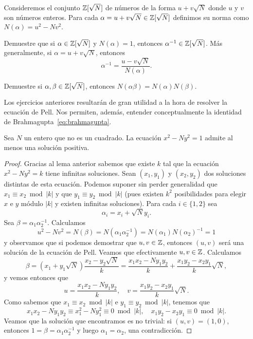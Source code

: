 Consideremos el conjunto $\mathbb{Z}[\sqrt{N}]$ de números de la forma $u+v\sqrt{N}$
donde $u$ y $v$ son números enteros.  Para cada
$\alpha=u+v\sqrt{N}\in\mathbb{Z}[\sqrt{N}]$ definimos su norma como
$N(\alpha)=u^2-Nv^2$. 

\begin{exercise}
	\label{xca:Pell}
	Demuestre que si $\alpha\in\mathbb{Z}[\sqrt{N}]$ y $N(\alpha)=1$, entonces
	$\alpha^{-1}\in\mathbb{Z}[\sqrt{N}]$. Más generalmente, si $\alpha=u+v\sqrt{N}$,
	entonces
	\[
		\alpha^{-1}=\frac{u-v\sqrt{N}}{N(\alpha)}.
	\]
\end{exercise}

\begin{exercise}
	Demuestre si $\alpha,\beta\in\mathbb{Z}[\sqrt{N}]$, entonces
	$N(\alpha\beta)=N(\alpha)N(\beta)$.
\end{exercise}

Los ejercicios anteriores resultarán de gran utilidad a la hora de resolver la
ecuación de Pell. Nos permiten, además, entender conceptualmente la identidad
de Brahmagupta~\eqref{eq:brahmagupta}. 

\begin{theorem}[Lagrange]
	Sea $N$ un entero que no es un cuadrado. La ecuación $x^2-Ny^2=1$ admite al
	menos una solución positiva. 
\end{theorem}

\begin{proof}
	Gracias al lema anterior sabemos que existe $k$ tal que la ecuación
	$x^2-Ny^2=k$ tiene infinitas soluciones. Sean $(x_1,y_1)$ y $(x_2,y_2)$ dos
	soluciones distintas de esta ecuación. Podemos suponer sin perder generalidad que
	$x_1\equiv x_2\bmod{|k|}$ y que $y_1\equiv y_2\bmod{|k|}$ (pues existen
	$k^2$ posibilidades para elegir $x$ e $y$ módulo $|k|$ y existen infinitas
	soluciones). Para cada $i\in\{1,2\}$ sea 
	\[
		\alpha_i=x_i+\sqrt{N}y_i.
	\]
	Sea $\beta=\alpha_1\alpha_2^{-1}$. Calculamos 
	\[
		u^2-Nv^2=N(\beta)=N(\alpha_1\alpha_2^{-1})=N(\alpha_1)N(\alpha_2)^{-1}=1 
	\]
	y observamos que si podemos demostrar que $u,v\in\mathbb{Z}$, entonces $(u,v)$ será
	una solución de la ecuación de Pell. Veamos que efectivamente $u,v\in\mathbb{Z}$.
	Calculamos 
	\[
		\beta=(x_1+y_1\sqrt{N})\frac{x_2-y_2\sqrt{N}}{k}
		=\frac{x_1x_2-Ny_1y_2}{k}+\frac{x_1y_2-x_2y_1}{k}\sqrt{N},
	\]
	y vemos entonces que
	\[
	u=\frac{x_1x_2-Ny_1y_2}{k},
	\quad
	v=\frac{x_1y_2-x_2y_1}{k}\sqrt{N}.
	\]
	Como 
	sabemos que $x_1\equiv x_2\bmod{|k|}$ e $y_1\equiv y_2\bmod{|k|}$, tenemos que
	\[
		x_1x_2-Ny_1y_2\equiv x_1^2-Ny_1^2\equiv 0\bmod {|k|},\quad
		x_1y_2-x_2y_1\equiv 0\bmod{|k|}.
	\]
	Veamos que la solución que encontramos es no trivial: si $(u,v)=(1,0)$,
	entonces $1=\beta=\alpha_1\alpha_2^{-1}$ y luego $\alpha_1=\alpha_2$, una
	contradicción.
\end{proof}

